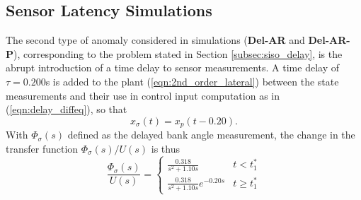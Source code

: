 \subsection{Sensor Latency Simulations}\label{subsec:siso_delay_sims}
The second type of anomaly considered in simulations (\textbf{Del-AR} and \textbf{Del-AR-P}), corresponding to the problem stated in Section \ref{subsec:siso_delay}, is the abrupt introduction of a time delay to sensor measurements. A time delay of $\tau = 0.200$s is added to the plant (\ref{eqn:2nd_order_lateral}) between the state measurements and their use in control input computation as in (\ref{eqn:delay_diffeq}), so that
\begin{equation}
	x_\sigma(t) = x_p(t - 0.20).
\end{equation}
With $\Phi_\sigma(s)$ defined as the delayed bank angle measurement, the change in the transfer function $\Phi_\sigma(s)/U(s)$ is thus
\begin{equation}
		\frac{\Phi_\sigma(s)}{U(s)} = \begin{cases}
			\frac{0.318}{s^2 + 1.10s} & t < t_1^*\\
			\frac{0.318}{s^2 + 1.10s}e^{-0.20 s} & t \geq t_1^*
		\end{cases} 
\end{equation}

